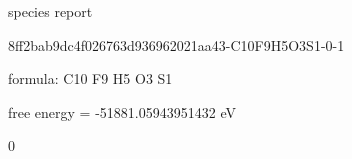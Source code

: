 \documentclass{article}
\begin{document}
\setlength\parindent{0pt}


species report



8ff2bab9dc4f026763d936962021aa43-C10F9H5O3S1-0-1



formula: C10 F9 H5 O3 S1



free energy = -51881.05943951432 eV

0
\end{document}
